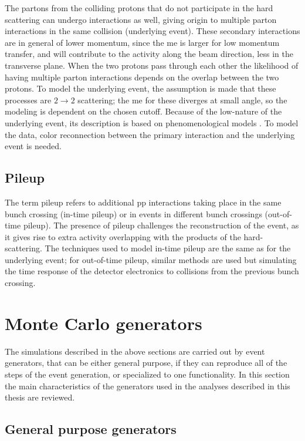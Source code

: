 The partons from the colliding protons that do not participate in the hard scattering can undergo interactions as well, giving origin to multiple parton interactions in the same collision (underlying event).
These secondary interactions are in general of lower momentum, since the \gls{me} is larger for low momentum transfer, and will contribute to the activity along the beam direction, less in the transverse plane. 
When the two protons pass through each other the likelihood of having multiple parton interactions depends on the overlap between the two protons. 
To model the underlying event, the assumption is made that these processes are $2\rightarrow2$ scattering; the \gls{me} for these diverges at small angle, so the modeling is dependent on the chosen \pt cutoff. 
Because of the low-\pt nature of the underlying event, its description is based on phenomenological models \cite{ATL-PHYS-PUB-2014-021,Skands:2010ak}.
To model the data, color reconnection between the primary interaction and the underlying event is needed. 

\subsection{Pileup}

The term pileup refers to additional \gls{pp} interactions taking place in the same bunch crossing (in-time pileup) or in events in different bunch crossings (out-of-time pileup). 
The presence of pileup challenges the reconstruction of the event, as it gives rise to extra activity overlapping with the products of the hard-scattering. The techniques used to model in-time pileup are the same as for the underlying event; 
for out-of-time pileup, similar methods are used but simulating the time response of the detector electronics to collisions from the previous bunch crossing. 

\section{Monte Carlo generators}
\label{sec:mcgen}

The simulations described in the above sections are carried out by event generators, that can be either general purpose, 
if they can reproduce all of the steps of the event generation, or specialized to one functionality. 
In this section the main characteristics of the generators used in the analyses described in this thesis are reviewed.

\subsection{General purpose generators}


